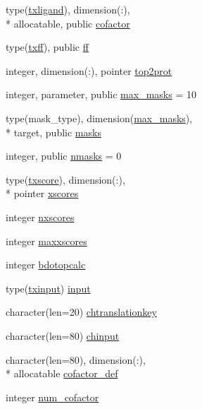 \begin{DoxyCompactItemize}
type(\hyperlink{structcalc__xscore_1_1txligand}{txligand}), dimension(\-:), \\*
allocatable, public \hyperlink{classcalc__xscore_a9ec517980814024a26fcabd005ab66c2}{cofactor}
\item 
type(\hyperlink{structcalc__xscore_1_1txff}{txff}), public \hyperlink{classcalc__xscore_a95d3b146435fd7fd216201f6119869c0}{ff}
\item 
integer, dimension(\-:), pointer \hyperlink{classcalc__xscore_aebe63f3ce296f45ec9981bb543365496}{top2prot}
\item 
integer, parameter, public \hyperlink{classcalc__xscore_a64db4ecf19efbbb299ff1a02b5226cb5}{max\-\_\-masks} = 10
\item 
type(mask\-\_\-type), dimension(\hyperlink{classcalc__xscore_a64db4ecf19efbbb299ff1a02b5226cb5}{max\-\_\-masks}), \\*
target, public \hyperlink{classcalc__xscore_a30db4ba703ae8fee5bd58cf5a9da1d71}{masks}
\item 
integer, public \hyperlink{classcalc__xscore_af693b82837ceeea888b600fda95b6d54}{nmasks} = 0
\item 
type(\hyperlink{structcalc__xscore_1_1txscore}{txscore}), dimension(\-:), \\*
pointer \hyperlink{classcalc__xscore_ab5912d1fa25efa1a253fc3c295329b57}{xscores}
\item 
integer \hyperlink{classcalc__xscore_a4a8a5bc66c708de615c133b0ed418d5c}{nxscores}
\item 
integer \hyperlink{classcalc__xscore_aa0c3f01df3b71dc62bde71795e981f2a}{maxxscores}
\item 
integer \hyperlink{classcalc__xscore_a85093822797537a637acaa4b645070eb}{bdotopcalc}
\item 
type(\hyperlink{structcalc__xscore_1_1txinput}{txinput}) \hyperlink{classcalc__xscore_a8bb1f4602ad30ce8f3059e0521c08824}{input}
\item 
character(len=20) \hyperlink{classcalc__xscore_a7f7e08bee04534a933fe241f21831b27}{chtranslationkey}
\item 
character(len=80) \hyperlink{classcalc__xscore_ae08add3b682f31e7d85dd1d01b756e92}{chinput}
\item 
character(len=80), dimension(\-:), \\*
allocatable \hyperlink{classcalc__xscore_ac0ad4aa0cc1ff5cdcbb241d2349ffcfb}{cofactor\-\_\-def}
\item 
integer \hyperlink{classcalc__xscore_acdff1eeb76e14d339fa4f21f302ef3a6}{num\-\_\-cofactor}
\item 

\end{DoxyCompactItemize}
